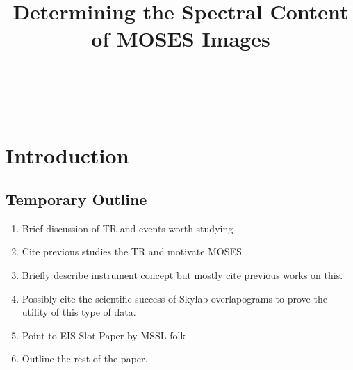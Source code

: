 \documentclass[]{solarphysics}
\newcommand{\cck}[1]{{\color{red} CCK: #1}} %
\newcommand{\jdp}[1]{{\color{blue} JDP: #1}} %
\begin{document}
\begin{article}
\begin{opening}

\title{Determining the Spectral Content of MOSES Images}

\author[addressref={aff1},corref,email={jacob.parker3@montana.edu}]{~}%
\author[addressref=aff1,email={Want to include your email Charles?}]{~}%
\address[id=aff1]{Montana State University}




\begin{abstract}

\end{abstract}
\end{opening}

\section{Introduction}

\subsection{Temporary Outline}	
	\begin{enumerate}
		\item Brief discussion of TR and events worth studying
		\item Cite previous studies the TR and motivate MOSES
		\item Briefly describe instrument concept but mostly cite previous works on this.
		\item Possibly cite the scientific success of Skylab overlapograms to prove the utility of this type of data.
		\item Point to EIS Slot Paper by MSSL folk
		\item Outline the rest of the paper.
		
	\end{enumerate}

	

	
%	 
%	
%
%	
%
	

\end{article}
\end{document}
